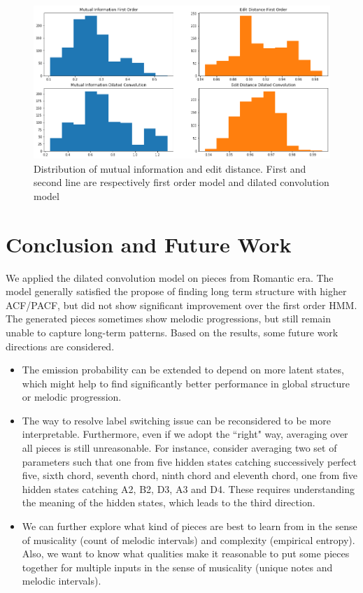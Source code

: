 \documentclass[10pt, oneside]{article}
\begin{document}
\begin{figure}[H]
\centering

  \includegraphics[width=0.9\linewidth]{mued.png}
  \caption{Distribution of mutual information and edit distance. First and second line are respectively first order model and dilated convolution model }
  \label{fig:mued}
\end{figure}

\section{Conclusion and Future Work}
We applied the dilated convolution model on pieces from Romantic era. The model generally satisfied the propose of finding long term structure with higher ACF/PACF, but did not show significant improvement over the first order HMM. The generated pieces sometimes show melodic progressions, but still remain unable to capture long-term patterns. 
Based on the results, some future work directions are considered. 
\begin{itemize}
\item The emission probability can be extended to depend on more latent states, which might help to find significantly better performance in global structure or melodic progression. 
\item The way to resolve label switching issue can be reconsidered to be more interpretable. Furthermore, even if we adopt the ``right" way, averaging over all pieces is still unreasonable. For instance, consider averaging two set of parameters such that one from five hidden states catching successively perfect five, sixth chord, seventh chord, ninth chord and eleventh chord, one from five hidden states catching A2, B2, D3, A3 and D4. These requires understanding the meaning of the hidden states, which leads to the third direction.
\item We can further explore what kind of pieces are best to learn from in the sense of musicality (count of melodic intervals) and  complexity (empirical entropy). Also, we want to know what qualities make it reasonable to put some pieces together for multiple inputs in the sense of musicality (unique notes and melodic intervals).
\end{itemize}


\end{document}
